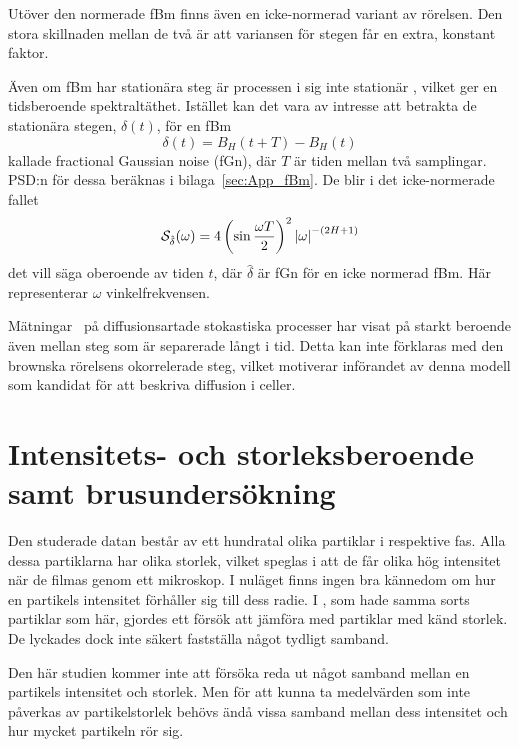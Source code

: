 Utöver den normerade fBm finns även en icke-normerad variant av rörelsen. Den stora skillnaden mellan de två är att variansen för stegen får en extra, konstant faktor.

Även om fBm har stationära steg är processen i sig inte stationär \cite{Flandrin_fBmspektrum1989}, vilket ger en tidsberoende spektraltäthet. Istället kan det vara av intresse att betrakta de stationära stegen, $\delta (t)$, för en fBm
\begin{equation}
    \delta(t)=B_H(t+T)-B_H(t)
\end{equation} 
kallade fractional Gaussian noise (fGn), där $T$ är tiden mellan två samplingar. PSD:n för dessa beräknas i bilaga~\ref{sec:App_fBm}. De blir i det icke-normerade fallet
\begin{equation}
    \mathcal{S}_{\hat{\delta}}(\omega)=4\left(\sin{\frac{\omega T}{2}}\right)^2 \abs{\omega}^{-(2H+1)}
\end{equation}
det vill säga oberoende av tiden $t$, där $\hat{\delta}$ är fGn för en icke normerad fBm. Här representerar $\omega$ vinkelfrekvensen.

Mätningar~\cite{Mandelbrot_fBm1968} på diffusionsartade stokastiska processer har visat på starkt beroende även mellan steg som är separerade långt i tid. Detta kan inte förklaras med den brownska rörelsens okorrelerade steg, vilket motiverar införandet av denna modell som kandidat för att beskriva diffusion i celler. 


\section{Intensitets- och storleksberoende samt brusundersökning} \label{sec:storleksberoende}

Den studerade datan består av ett hundratal olika partiklar i respektive fas. Alla dessa partiklarna har olika storlek, vilket speglas i att de får olika hög intensitet när de filmas genom ett mikroskop. I nuläget finns ingen bra kännedom om hur en partikels intensitet förhåller sig till dess radie. I \cite{Parry_etal2014}, som hade samma sorts partiklar som här, gjordes ett försök att jämföra med partiklar med känd storlek. De lyckades dock inte säkert fastställa något tydligt samband.

Den här studien kommer inte att försöka reda ut något samband mellan en partikels intensitet och storlek. Men för att kunna ta medelvärden som inte påverkas av partikelstorlek behövs ändå vissa samband mellan dess intensitet och hur mycket partikeln rör sig.


